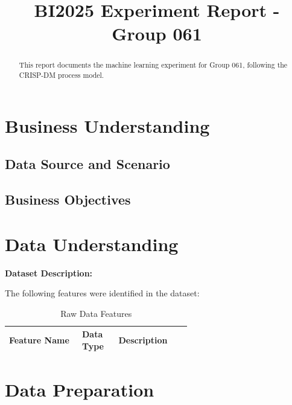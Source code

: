 \documentclass[sigconf]{acmart}
\begin{document}
\title{BI2025 Experiment Report - Group 061}


\begin{abstract}
  This report documents the machine learning experiment for Group 061, following the CRISP-DM process model.
\end{abstract}


\maketitle

\section{Business Understanding}

\subsection{Data Source and Scenario}


\subsection{Business Objectives}


\section{Data Understanding}
\textbf{Dataset Description:} 

The following features were identified in the dataset:

\begin{table}[h]
  \caption{Raw Data Features}
  \label{tab:features}
  \begin{tabular}{lp{0.2\linewidth}p{0.4\linewidth}}
    \toprule
    \textbf{Feature Name} & \textbf{Data Type} & \textbf{Description} \\
    \midrule
    
    \bottomrule
  \end{tabular}
\end{table}

\section{Data Preparation}
\end{document}
